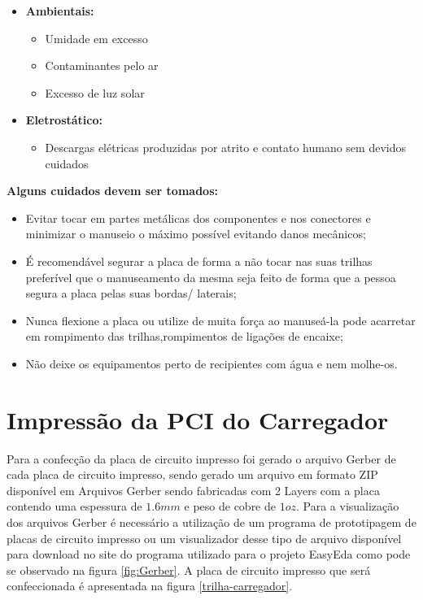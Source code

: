 \begin{itemize}
\item \textbf{Ambientais:}
\begin{itemize}
\item Umidade em excesso
\item Contaminantes pelo ar 
\item Excesso de luz solar
\end{itemize}
\end{itemize}

\begin{itemize}
\item \textbf{Eletrostático:}
\begin{itemize}
\item Descargas elétricas produzidas por atrito e contato humano sem devidos cuidados
\end{itemize}
\end{itemize}

\par {\textbf{Alguns cuidados devem ser tomados:}}

\begin{itemize}
\item Evitar tocar em partes metálicas dos componentes e nos conectores e minimizar o manuseio o máximo possível evitando danos mecânicos;
\item É recomendável segurar a placa de forma a não tocar nas suas trilhas preferível que o manuseamento da mesma seja feito de forma que a pessoa segura a placa pelas suas bordas/ laterais;  

\item Nunca flexione a placa ou utilize de muita força ao manuseá-la pode acarretar em rompimento das trilhas,rompimentos de ligações  de encaixe;

\item Não deixe os equipamentos perto de recipientes com água e nem molhe-os.
\end{itemize}

\section{Impressão da PCI do Carregador}

\par Para a confecção da placa de circuito impresso foi gerado o arquivo Gerber de cada placa de circuito impresso, sendo gerado um arquivo em formato ZIP disponível em Arquivos Gerber sendo fabricadas com 2 Layers com a placa contendo uma espessura de $1.6 mm$ e peso de cobre de $1 oz$. Para a visualização dos arquivos Gerber é necessário a utilização de um programa de prototipagem de placas de circuito impresso ou um visualizador desse tipo de arquivo disponível para download no site do programa utilizado para o projeto EasyEda como pode se observado na figura \ref{fig:Gerber}. A placa de circuito impresso que será confeccionada é apresentada na figura \ref{trilha-carregador}.

